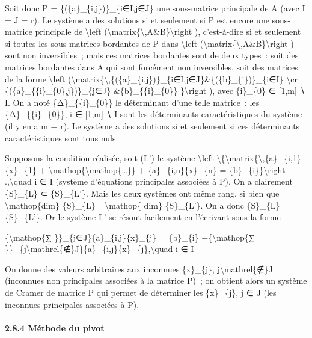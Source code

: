 \documentclass[]{article}
\begin{document}
Soit donc P = \{(\{a\}\_\{i,j\})\}\_\{i∈I,j∈J\} une sous-matrice
principale de A (avec \textbar{}I\textbar{} = \textbar{}J\textbar{} =
r). Le système a des solutions si et seulement si P est encore une
sous-matrice principale de \textbackslash{}left
(\textbackslash{}matrix\{\textbackslash{},A\&B\}\textbackslash{}right ),
c'est-à-dire si et seulement si toutes les sous matrices bordantes de P
dans \textbackslash{}left
(\textbackslash{}matrix\{\textbackslash{},A\&B\}\textbackslash{}right )
sont non inversibles~; mais ces matrices bordantes sont de deux types~:
soit des matrices bordantes dans A qui sont forcément non inversibles,
soit des matrices de la forme \textbackslash{}left
(\textbackslash{}matrix\{\textbackslash{},\{(\{a\}\_\{i,j\})\}\_\{i∈I,j∈J\}\&\{(\{b\}\_\{i\})\}\_\{i∈I\}
\textbackslash{}cr \{(\{a\}\_\{\{i\}\_\{0\},j\})\}\_\{j∈J\}
\&\{b\}\_\{\{i\}\_\{0\}\} \}\textbackslash{}right ), avec \{i\}\_\{0\} ∈
{[}1,m{]} ∖ I. On a noté \{Δ\}\_\{\{i\}\_\{0\}\} le déterminant d'une
telle matrice~: les \{Δ\}\_\{\{i\}\_\{0\}\}, i ∈ {[}1,m{]} ∖ I sont les
déterminants caractéristiques du système (il y en a m − r). Le système a
des solutions si et seulement si ces déterminants caractéristiques sont
tous nuls.

Supposons la condition réalisée, soit (L') le système
\textbackslash{}left
\textbackslash{}\{\textbackslash{}matrix\{\textbackslash{},\{a\}\_\{i,1\}\{x\}\_\{1\}
+ \textbackslash{}mathop\{\textbackslash{}mathop\{\ldots{}\}\} +
\{a\}\_\{i,n\}\{x\}\_\{n\} = \{b\}\_\{i\}\}\textbackslash{}right
.,\textbackslash{}quad i ∈ I (système d'équations principales associées
à P). On a clairement \{S\}\_\{L\} ⊂ \{S\}\_\{L'\}. Mais les deux
systèmes ont même rang, si bien que \textbackslash{}mathop\{dim\}
\{S\}\_\{L\} =\textbackslash{}mathop\{ dim\} \{S\}\_\{L'\}. On a donc
\{S\}\_\{L\} = \{S\}\_\{L'\}. Or le système L' se résout facilement en
l'écrivant sous la forme

\{\textbackslash{}mathop\{∑ \}\}\_\{j∈J\}\{a\}\_\{i,j\}\{x\}\_\{j\} =
\{b\}\_\{i\} −\{\textbackslash{}mathop\{∑
\}\}\_\{j\textbackslash{}mathrel\{∉\}J\}\{a\}\_\{i,j\}\{x\}\_\{j\},\textbackslash{}quad
i ∈ I

On donne des valeurs arbitraires aux inconnues \{x\}\_\{j\},
j\textbackslash{}mathrel\{∉\}J (inconnues non principales associées à la
matrice P)~; on obtient alors un système de Cramer de matrice P qui
permet de déterminer les \{x\}\_\{j\}, j ∈ J (les inconnues principales
associées à P).

\paragraph{2.8.4 Méthode du pivot}
\end{document}

